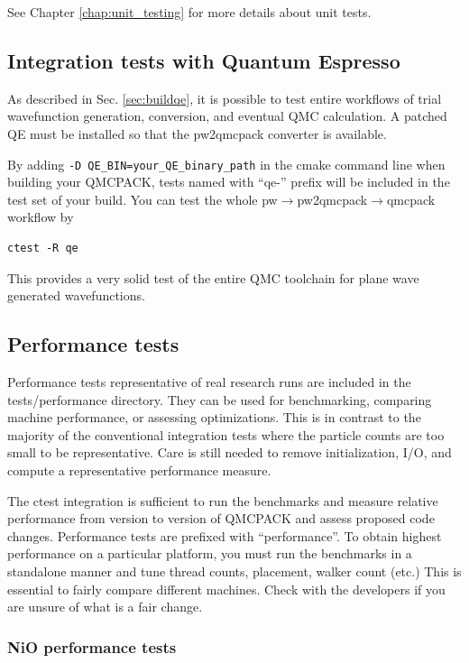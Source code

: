 See Chapter \ref{chap:unit_testing} for more details about unit tests.

\subsection{Integration tests with Quantum Espresso}
\label{sec:integtestqe}
As described in Sec. \ref{sec:buildqe}, it is possible to test entire
workflows of trial wavefunction generation, conversion, and eventual
QMC calculation. A patched QE must be installed so that the
pw2qmcpack converter is available.

By adding \texttt{-D QE\_BIN=your\_QE\_binary\_path} in the cmake command line when building your QMCPACK,
tests named with ``qe-'' prefix will be included in the test set of your build.
You can test the whole pw$\to$pw2qmcpack$\to$qmcpack workflow by
\verbatimfont{\footnotesize}
\begin{verbatim}
ctest -R qe
\end{verbatim}
This provides a very solid test of the entire QMC
toolchain for plane wave generated wavefunctions.

\subsection{Performance tests}
\label{sec:perftests}
Performance tests representative of real research runs are included in the
tests/performance directory. They can be used for benchmarking, comparing machine
performance, or assessing optimizations. This is in
contrast to the majority of the conventional integration tests where the particle
counts are too small to be representative. Care is still needed to
remove initialization, I/O, and compute a representative performance
measure.

The ctest integration is sufficient to run the benchmarks and measure
relative performance from version to version of QMCPACK and assess
proposed code changes. Performance tests are prefixed with
``performance''. To obtain highest performance on a particular
platform, you must run the benchmarks in a standalone manner and tune
thread counts, placement, walker count (etc.) This is essential to
fairly compare different machines. Check with the
developers if you are unsure of what is a fair change.

\subsubsection{NiO performance tests}

